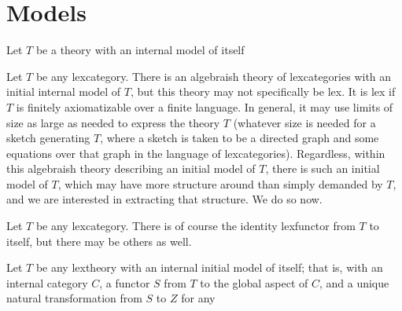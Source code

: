 \section{Models}

Let $T$ be a theory with an internal model of itself

Let $T$ be any lexcategory. There is an algebraish theory of lexcategories with an initial internal model of $T$, but this theory may not specifically be lex. It is lex if $T$ is finitely axiomatizable over a finite language. In general, it may use limits of size as large as needed to express the theory $T$ (whatever size is needed for a sketch generating $T$, where a sketch is taken to be a directed graph and some equations over that graph in the language of lexcategories). Regardless, within this algebraish theory describing an initial model of $T$, there is such an initial model of $T$, which may have more structure around than simply demanded by $T$, and we are interested in extracting that structure. We do so now. 

Let $T$ be any lexcategory. There is of course the identity lexfunctor from $T$ to itself, but there may be others as well.

Let $T$ be any lextheory with an internal initial model of itself; that is, with an internal category $C$, a functor $S$ from $T$ to the global aspect of $C$, and a unique natural transformation from $S$ to $Z$ for any 

